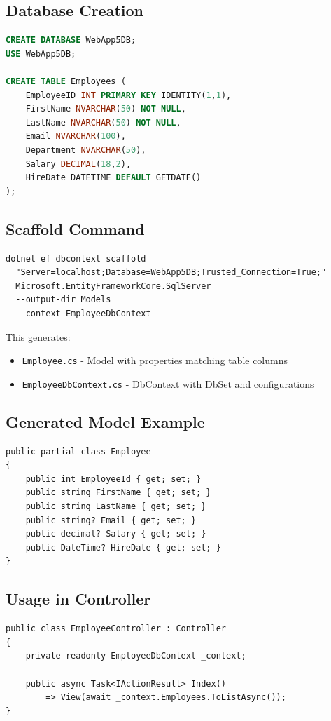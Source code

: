 \documentclass[10pt,a4paper]{article}
\begin{document}
\subsection*{Database Creation}
\begin{lstlisting}[language=SQL, basicstyle=\ttfamily\tiny]
CREATE DATABASE WebApp5DB;
USE WebApp5DB;

CREATE TABLE Employees (
    EmployeeID INT PRIMARY KEY IDENTITY(1,1),
    FirstName NVARCHAR(50) NOT NULL,
    LastName NVARCHAR(50) NOT NULL,
    Email NVARCHAR(100),
    Department NVARCHAR(50),
    Salary DECIMAL(18,2),
    HireDate DATETIME DEFAULT GETDATE()
);
\end{lstlisting}

\subsection*{Scaffold Command}
\begin{lstlisting}[basicstyle=\ttfamily\scriptsize]
dotnet ef dbcontext scaffold 
  "Server=localhost;Database=WebApp5DB;Trusted_Connection=True;" 
  Microsoft.EntityFrameworkCore.SqlServer 
  --output-dir Models 
  --context EmployeeDbContext
\end{lstlisting}

This generates:
\begin{itemize}
    \item \texttt{Employee.cs} - Model with properties matching table columns
    \item \texttt{EmployeeDbContext.cs} - DbContext with DbSet and configurations
\end{itemize}

\subsection*{Generated Model Example}
\begin{lstlisting}[basicstyle=\ttfamily\tiny]
public partial class Employee
{
    public int EmployeeId { get; set; }
    public string FirstName { get; set; }
    public string LastName { get; set; }
    public string? Email { get; set; }
    public decimal? Salary { get; set; }
    public DateTime? HireDate { get; set; }
}
\end{lstlisting}

\subsection*{Usage in Controller}
\begin{lstlisting}[basicstyle=\ttfamily\tiny]
public class EmployeeController : Controller
{
    private readonly EmployeeDbContext _context;
    
    public async Task<IActionResult> Index() 
        => View(await _context.Employees.ToListAsync());
}
\end{lstlisting}
\end{document}
